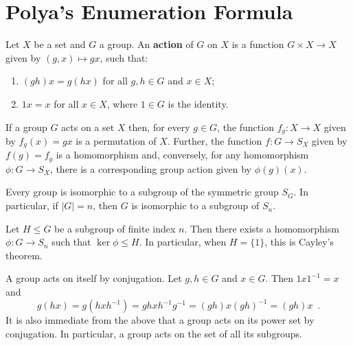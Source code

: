 \chapter{Polya's Enumeration Formula}

\begin{definition}
	\cite[99]{Rotman1967}
	\cite[41]{DummitFoote2004}
	Let $X$ be a set and $G$ a group. An \textbf{action} of $G$ on $X$ is a function
	$G \times X \to X$ given by $(g, x) \mapsto gx$, such that:
	\begin{enumerate}
		\item $(gh)x = g(hx)$ for all $g, h \in G$ and $x \in X$;
		\item $1x = x$ for all $x \in X$, where $1 \in G$ is the identity.
	\end{enumerate}
\end{definition}

\begin{proposition}
	\cite[99]{Rotman1967}
	\cite[42]{DummitFoote2004}
	If a group $G$ acts on a set $X$ then, for every $g \in G$, the function
	$f_g : X \to X$ given by $f_g(x) = gx$ is a permutation of $X$. Further, the function
	$f : G \to S_X$ given by $f(g) = f_g$ is a homomorphism and, conversely, for any
	homomorphism $\phi : G \to S_X$, there is a corresponding group action given by
	$\phi(g)(x)$.
\end{proposition}

\begin{theorem}[Cayley]
	\cite[96]{Rotman1967}
	\cite[120]{DummitFoote2004}
	Every group is isomorphic to a subgroup of the symmetric group $S_G$. In particular,
	if $|G| = n$, then $G$ is isomorphic to a subgroup of $S_n$.
\end{theorem}

\begin{theorem}
	\cite[97]{Rotman1967}
	Let $H \leq G$ be a subgroup of finite index $n$. Then there exists a homomorphism
	$\phi : G \to S_n$ such that $\ker \phi \leq H$. In particular, when $H = \{ 1 \}$,
	this is Cayley's theorem.
\end{theorem}

\begin{example}
	\cite[122]{DummitFoote2004}
	A group acts on itself by conjugation. Let $g, h \in G$ and $x \in G$. Then
	$1 x 1^{-1} = x$ and
	\begin{equation}
		g(hx) = g(h x h^{-1}) = gh x h^{-1}g^{-1} = (gh) x (gh)^{-1} = (gh)x \enspace.
	\end{equation}
	It is also immediate from the above that a group acts on its power set by conjugation.
	In particular, a group acts on the set of all its subgroups.
\end{example}

